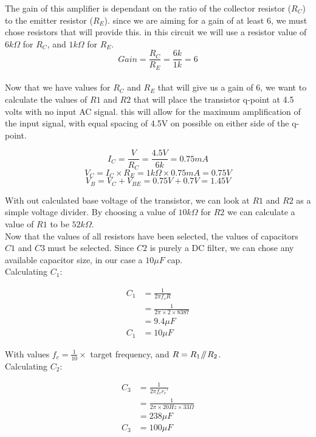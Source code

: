 \documentclass[a4paper,11pt]{article}
\newcommand{\parallelsum}{\mathbin{\!/\mkern-5mu/\!}}
\begin{document}
The gain of this amplifier is dependant on the ratio of the collector resistor ($R_C$) to the emitter resistor ($R_E$). since we are aiming for a gain of at least 6, we must chose resistors that will provide this. in this circuit we will use a resistor value of $6k \Omega$ for $R_C$, and $1k \Omega$ for $R_E$.\\

$$ Gain = \frac{R_C}{R_E} = \frac{6k}{1k} = 6 $$\\

Now that we have values for $R_C$ and $R_E$ that will give us a gain of 6, we want to calculate the values of $R1$ and $R2$ that will place the transistor q-point at 4.5 volts with no input AC signal. this will allow for the maximum amplification of the input signal, with equal spacing of 4.5V on possible on either side of the q-point.

$$I_C = \frac{V}{R_C} = \frac{4.5V}{6k} = 0.75mA$$
$$V_C = I_C \times R_E = 1k \Omega \times 0.75mA = 0.75V$$
$$V_B = V_C + V_{BE} = 0.75V + 0.7V = 1.45V$$

\pagebreak

With out calculated base voltage of the transistor, we can look at $R1$ and $R2$ as a simple voltage divider. By choosing a value of $10k \Omega$ for $R2$ we can calculate a value of $R1$ to be $ 52k \Omega$. \\

Now that the values of all resistors have been selected, the values of capacitors $C1$ and $C3$ must be selected. Since $C2$ is purely a DC filter, we can chose any available capacitor size, in our case a $10\mu F$ cap.\\

Calculating $C_1$:

\begin{align*}
  C_1 &= \frac{1}{2 \pi f_c R} \\
          &= \frac{1}{2\pi\times 2\times 8387} \\
          &=9.4 \mu F \\
          C_{1} &= 10\mu F
\end{align*}

With values $f_c = \frac{1}{10} \times$ target frequency, and $R = R_1 \parallelsum R_2$.\\

Calculating $C_2$:

\begin{align*}
    C_{3} &= \frac{1}{2\pi f_{c}r_{e}'} \\
          &= \frac{1}{2\pi \times 20Hz\times 33\Omega} \\
          &= 238\mu F \\
          C_{3} &= 100\mu F
\end{align*}
\end{document}
